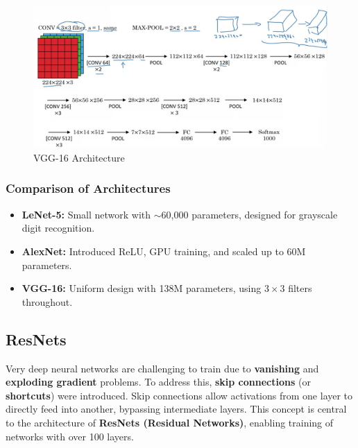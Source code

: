 \documentclass[letterpaper,12pt,notitlepage,twoside]{report}
\begin{document}
\begin{figure}[h]
	\centering
	\includegraphics[width=\textwidth]{Images/VGG-16.png}
	\caption{VGG-16 Architecture}
	\label{fig:34}
\end{figure}

\subsubsection{Comparison of Architectures}
\begin{itemize}[nosep]
    \item \textbf{LeNet-5:} Small network with $\sim$60,000 parameters, designed for grayscale digit recognition.
    \item \textbf{AlexNet:} Introduced ReLU, GPU training, and scaled up to 60M parameters.
    \item \textbf{VGG-16:} Uniform design with 138M parameters, using $3 \times 3$ filters throughout.
\end{itemize}

\subsection*{ResNets}
Very deep neural networks are challenging to train due to \textbf{vanishing} and \textbf{exploding gradient} problems. To address this, \textbf{skip connections} (or \textbf{shortcuts}) were introduced. Skip connections allow activations from one layer to directly feed into another, bypassing intermediate layers. This concept is central to the architecture of \textbf{ResNets (Residual Networks)}, enabling training of networks with over 100 layers.
\end{document}
